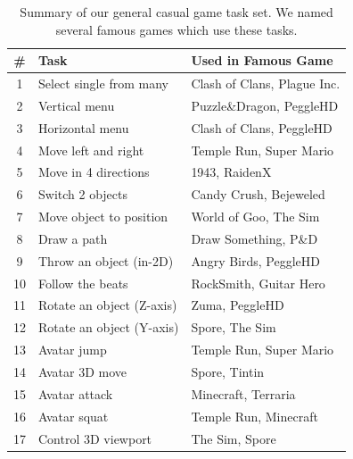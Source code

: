 \documentclass{sigchi}
\newcommand\tabhead[1]{\small\textbf{#1}}
\begin{document}
  \begin{table}
    \centering
    \begin{tabular}{|c|l|l|}
      \hline
      \tabhead{\#} &
      \multicolumn{1}{|p{0.4\columnwidth}|}{\centering\tabhead{Task}} &
      \multicolumn{1}{|p{0.45\columnwidth}|}{\centering\tabhead{Used in Famous Game}} \\
      \hline
      1 & Select single from many & Clash of Clans, Plague Inc.\\
      \hline
      2 & Vertical menu & Puzzle\&Dragon, PeggleHD \\
      \hline
      3 & Horizontal menu & Clash of Clans, PeggleHD\\
      \hline
      4 & Move left and right & Temple Run, Super Mario\\
      \hline
      5 & Move in 4 directions & 1943, RaidenX\\
      \hline
      6 & Switch 2 objects & Candy Crush, Bejeweled\\
      \hline
      7 & Move object to position & World of Goo, The Sim\\
      \hline
      8 & Draw a path & Draw Something, P\&D\\
      \hline
      9 & Throw an object (in-2D) & Angry Birds, PeggleHD\\
      \hline
      10 & Follow the beats & RockSmith, Guitar Hero\\
      \hline
      11 & Rotate an object (Z-axis) & Zuma, PeggleHD \\
      \hline
      12 & Rotate an object (Y-axis) & Spore, The Sim\\
      \hline
      13 & Avatar jump & Temple Run, Super Mario\\
      \hline
      14 & Avatar 3D move & Spore, Tintin\\
      \hline
      15 & Avatar attack & Minecraft, Terraria\\
      \hline
      16 & Avatar squat & Temple Run, Minecraft\\
      \hline
      17 & Control 3D viewport & The Sim, Spore\\
      \hline

    \end{tabular}
    \caption{Summary of our general casual game task set. We named several famous games which use these tasks.}
    \label{tab:table1}
  \end{table}
\end{document}
